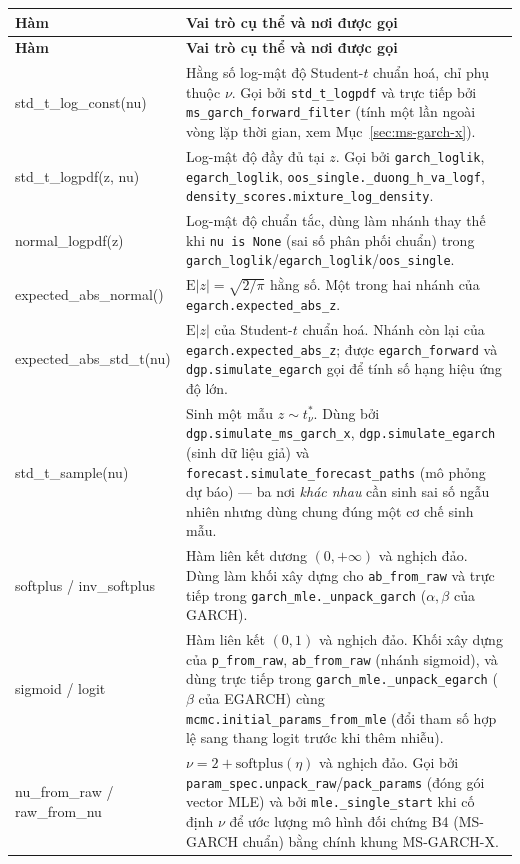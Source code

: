 \documentclass[11pt,a4paper]{article}
\newcommand{\code}[1]{\texttt{#1}}
\begin{document}
\begin{longtable}{@{}>{\ttfamily\scriptsize\raggedright\arraybackslash}p{5.0cm} >{\raggedright\arraybackslash}p{9.5cm}@{}}
\toprule
\textbf{\normalfont Hàm} & \textbf{Vai trò cụ thể và nơi được gọi} \\
\midrule
\endfirsthead
\toprule
\textbf{\normalfont Hàm} & \textbf{Vai trò cụ thể và nơi được gọi} \\
\midrule
\endhead
\bottomrule
\endfoot
std\_t\_log\_const(nu) & Hằng số log-mật độ Student-$t$ chuẩn hoá, chỉ phụ thuộc $\nu$. Gọi bởi \code{std\_t\_logpdf} và trực tiếp bởi \code{ms\_garch\_forward\_filter} (tính một lần ngoài vòng lặp thời gian, xem Mục~\ref{sec:ms-garch-x}). \\
std\_t\_logpdf(z, nu) & Log-mật độ đầy đủ tại $z$. Gọi bởi \code{garch\_loglik}, \code{egarch\_loglik}, \code{oos\_single.\_duong\_h\_va\_logf}, \code{density\_scores.mixture\_log\_density}. \\
normal\_logpdf(z) & Log-mật độ chuẩn tắc, dùng làm nhánh thay thế khi \code{nu is None} (sai số phân phối chuẩn) trong \code{garch\_loglik}/\code{egarch\_loglik}/\code{oos\_single}. \\
expected\_abs\_normal() & $\mathrm E|z|=\sqrt{2/\pi}$ hằng số. Một trong hai nhánh của \code{egarch.expected\_abs\_z}. \\
expected\_abs\_std\_t(nu) & $\mathrm E|z|$ của Student-$t$ chuẩn hoá. Nhánh còn lại của \code{egarch.expected\_abs\_z}; được \code{egarch\_forward} và \code{dgp.simulate\_egarch} gọi để tính số hạng hiệu ứng độ lớn. \\
std\_t\_sample(nu) & Sinh một mẫu $z\sim t^*_\nu$. Dùng bởi \code{dgp.simulate\_ms\_garch\_x}, \code{dgp.simulate\_egarch} (sinh dữ liệu giả) và \code{forecast.simulate\_forecast\_paths} (mô phỏng dự báo) --- ba nơi \emph{khác nhau} cần sinh sai số ngẫu nhiên nhưng dùng chung đúng một cơ chế sinh mẫu. \\
softplus / inv\_softplus & Hàm liên kết dương $(0,+\infty)$ và nghịch đảo. Dùng làm khối xây dựng cho \code{ab\_from\_raw} và trực tiếp trong \code{garch\_mle.\_unpack\_garch} ($\alpha,\beta$ của GARCH). \\
sigmoid / logit & Hàm liên kết $(0,1)$ và nghịch đảo. Khối xây dựng của \code{p\_from\_raw}, \code{ab\_from\_raw} (nhánh sigmoid), và dùng trực tiếp trong \code{garch\_mle.\_unpack\_egarch} ($\beta$ của EGARCH) cùng \code{mcmc.initial\_params\_from\_mle} (đổi tham số hợp lệ sang thang logit trước khi thêm nhiễu). \\
nu\_from\_raw / raw\_from\_nu & $\nu = 2+\mathrm{softplus}(\eta)$ và nghịch đảo. Gọi bởi \code{param\_spec.unpack\_raw}/\code{pack\_params} (đóng gói vector MLE) và bởi \code{mle.\_single\_start} khi cố định $\nu$ để ước lượng mô hình đối chứng B4 (MS-GARCH chuẩn) bằng chính khung MS-GARCH-X. \\

\end{longtable}
\end{document}
